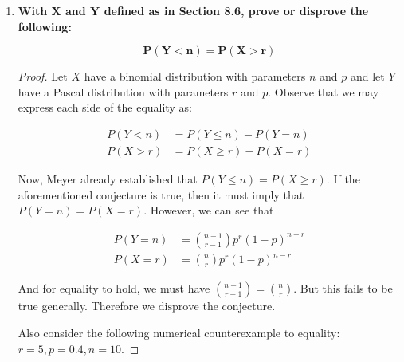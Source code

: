 \documentclass[10pt, oneside]{article}
\begin{document}
\begin{enumerate}[label=8.\arabic*]
For $Y = k$ attempts, our cost function can be written as

\[ \text{Cost} = 5000Y + 500(Y - 3) = 5500Y - 1500 \]

Then by the linearity of the expectation function, we have

\[ E[\text{Cost}] = 5500 E[Y] - 1500 \]

Where $E[Y]$ is equal to

\[ E[Y] = \sum^{\infty}_{k=3} k \binom{k-1}{2} (0.8)^3 (0.2)^{k-3} = 3.75 \]

Therefore, $\boxed{E[\text{Cost}] = \$ 19,125}$.

\item  \begin{tcolorbox}[
  colback=Cerulean!5!white,
  colframe=Cerulean!75!black]
\textbf{With $\bm{X}$ and $\bm{Y}$ defined as in Section 8.6, prove or disprove the following:}

\[ \bm{P(Y < n) = P(X > r)} \]
\end{tcolorbox}

\begin{proof}
Let $X$ have a binomial distribution with parameters $n$ and $p$ and let $Y$ have a Pascal distribution with parameters $r$ and $p$. Observe that we may express each side of the equality as:

\begin{align*}
P(Y < n) &= P(Y \leq n) - P(Y = n) \\
P(X > r) &= P(X \geq r) - P(X = r)
\end{align*}

Now, Meyer already established that $P(Y \leq n) = P(X \geq r)$. If the aforementioned conjecture is true, then it must imply that $P(Y = n) = P(X = r)$. However, we can see that

\begin{align*}
P(Y = n) &= \binom{n-1}{r-1} p^r (1-p)^{n-r} \\
P(X = r) &= \binom{n}{r} p^r (1-p)^{n-r}
\end{align*}

And for equality to hold, we must have $\binom{n-1}{r-1} = \binom{n}{r}$. But this fails to be true generally. Therefore we $\boxed{\text{disprove}}$ the conjecture.

Also consider the following numerical counterexample to equality: $r = 5, p = 0.4, n = 10$.
\end{proof}

\end{enumerate}
\end{document}
